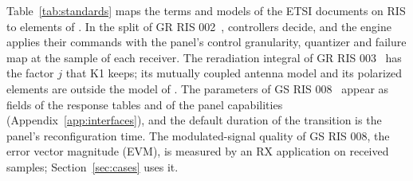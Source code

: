 Table~\ref{tab:standards} maps the terms and models of the ETSI documents
on RIS to elements of \sremu{}. In the split of GR RIS 002~\cite{ETSI_GR_RIS002_v121},
controllers decide, and the engine applies their commands with the panel's control
granularity, quantizer and failure map at the sample of each receiver. The reradiation integral of GR RIS
003~\cite{ETSI_GR_RIS003_v121} has the factor $j$ that K1 keeps; its mutually coupled antenna
model and its polarized elements are outside the model of \sremu{}. The parameters of GS RIS
008~\cite{ETSI_GS_RIS008} appear as fields of the response tables and of the panel
capabilities (Appendix~\ref{app:interfaces}), and the default duration of the transition is
the panel's reconfiguration time. The modulated-signal quality of GS RIS 008, the error
vector magnitude (EVM), is measured by an RX application on received samples;
Section~\ref{sec:cases} uses it.


